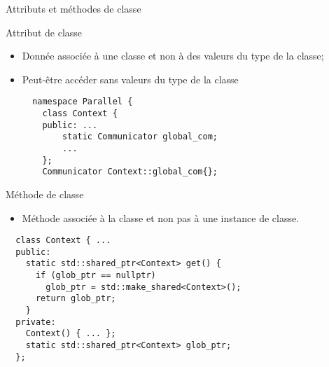 \documentclass[compress,10pt,aspectratio=169]{beamer}
\begin{document}
  \begin{frame}[fragile]{Attributs et méthodes de classe}
    \scriptsize
    \begin{block}{\small Attribut de classe}
    \begin{itemize}
    \item Donnée associée à une classe et non à des valeurs du type de la classe;
    \item Peut-être accéder sans valeurs du type de la classe
    \begin{multicols}{2}
    \vspace*{-6mm}
    \begin{verbatim}
  namespace Parallel {
    class Context {
    public: ...
        static Communicator global_com;
        ...
    };
    Communicator Context::global_com{};
  \end{verbatim}
  \end{multicols}
  \end{itemize}
  \end{block}
  \vspace{-4mm}
  \begin{block}{\small Méthode de classe}
    \begin{itemize}
    \item Méthode associée à la classe et non pas à une instance de classe.
    \end{itemize}
    \begin{multicols}{2}
    \vspace*{-6mm}
    \begin{verbatim}
  class Context { ...
  public:
    static std::shared_ptr<Context> get() {
      if (glob_ptr == nullptr) 
        glob_ptr = std::make_shared<Context>();
      return glob_ptr;
    }
  private:
    Context() { ... };
    static std::shared_ptr<Context> glob_ptr;
  };
  \end{verbatim}
  \end{multicols}
  \end{block}
  \end{frame}
    
\end{document}
